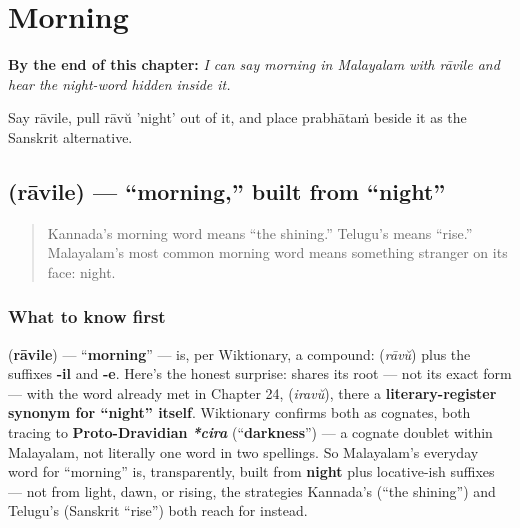 
\chapter{Morning}
\label{ch:ml-morning}

\begin{chapteropening}
\textbf{By the end of this chapter:} \emph{I can say morning in Malayalam with rāvile and hear the night-word hidden inside it.}

Say rāvile, pull rāvŭ 'night' out of it, and place prabhātaṁ beside it as the Sanskrit alternative.
\end{chapteropening}

\section[\texorpdfstring{\ml{രാവിലെ} (rāvile)}{രാവിലെ (rāvile)}]{ (rāvile) — \textquotedblleft{}morning,\textquotedblright{} built from \textquotedblleft{}night\textquotedblright{}}

\label{lesson:ML-C26-raavile}



\begin{quote}
Kannada's morning word means \textquotedblleft{}the shining.\textquotedblright{} Telugu's means \textquotedblleft{}rise.\textquotedblright{} Malayalam's most common morning word means something stranger on its face: night.
\end{quote}

\subsection*{What to know first}
\textbf{} (\textbf{rāvile}) — \textquotedblleft{}\textbf{morning}\textquotedblright{} — is, per Wiktionary, a compound: \textbf{} (\emph{rāvŭ}) plus the suffixes \textbf{-il} and \textbf{-e}. Here's the honest surprise: \textbf{} shares its root — not its exact form — with the word already met in Chapter 24, \textbf{} (\emph{iravŭ}), there a \textbf{literary-register synonym for \textquotedblleft{}night\textquotedblright{} itself}. Wiktionary confirms both as cognates, both tracing to \textbf{Proto-Dravidian} \emph{\textbf{*cira}} (\textquotedblleft{}\textbf{darkness}\textquotedblright{}) — a cognate doublet within Malayalam, not literally one word in two spellings. So Malayalam's everyday word for \textquotedblleft{}morning\textquotedblright{} is, transparently, built from \textbf{night} plus locative-ish suffixes — not from light, dawn, or rising, the strategies Kannada's \textbf{} (\textquotedblleft{}the shining\textquotedblright{}) and Telugu's \textbf{} (Sanskrit \textquotedblleft{}rise\textquotedblright{}) both reach for instead.

